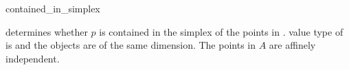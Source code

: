 \ccHtmlNoRefLinks
\begin{ccRefFunction}{contained_in_simplex}
\ccHtmlNoLinks

{determines whether $p$ is contained in the simplex
of the points in \ccc{A = tuple [first,last)}.
\ccPrecond value type of  is 
and the objects are of the same dimension. The points in $A$ are
affinely independent.}

\end{ccRefFunction}

